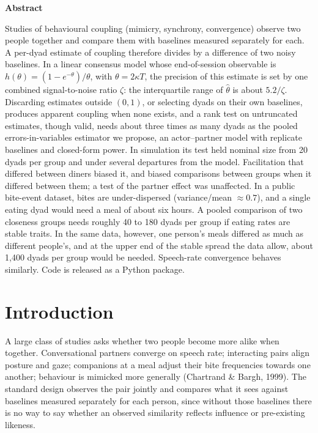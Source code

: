 \documentclass[12pt]{article}
\begin{document}
\begin{center}\textbf{Abstract}\end{center}
Studies of behavioural coupling (mimicry, synchrony, convergence) observe two
people together and compare them with baselines measured separately for each. A
per-dyad estimate of coupling therefore divides by a difference of two noisy
baselines. In a linear consensus model whose end-of-session observable is
$h(\theta)=(1-e^{-\theta})/\theta$, with $\theta=2\kappa T$, the precision of this
estimate is set by one combined signal-to-noise ratio $\zeta$: the interquartile
range of $\hat\theta$ is about $5.2/\zeta$. Discarding estimates outside $(0,1)$,
or selecting dyads on their own baselines, produces apparent coupling when none
exists, and a rank test on untruncated estimates, though valid, needs about three
times as many dyads as the pooled errors-in-variables estimator we propose, an
actor--partner model with replicate baselines and closed-form power. In
simulation its test held nominal size from 20 dyads per group and under several
departures from the model. Facilitation that differed between diners biased it,
and biased comparisons between groups when it differed between them; a test of
the partner effect was unaffected. In a public bite-event dataset, bites are
under-dispersed (variance/mean $\approx0.7$), and a single eating dyad would need
a meal of about six hours. A pooled comparison of two closeness groups needs
roughly 40 to 180 dyads per group if eating rates are stable traits. In the same
data, however, one person's meals differed as much as different people's, and at
the upper end of the stable spread the data allow, about 1,400 dyads per group
would be needed. Speech-rate convergence behaves similarly. Code is released as a
Python package.
\newpage

\section*{Introduction}

A large class of studies asks whether two people become more alike when together.
Conversational partners converge on speech rate; interacting pairs align posture
and gaze; companions at a meal adjust their bite frequencies towards one another;
behaviour is mimicked more generally (Chartrand \& Bargh, 1999). The standard design
observes the pair jointly and compares what it sees against baselines measured
separately for each person, since without those baselines there is no way to say
whether an observed similarity reflects influence or pre-existing likeness.
\end{document}
